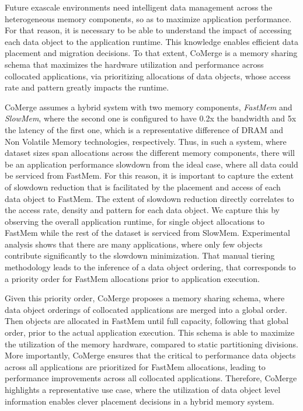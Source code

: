 Future exascale environments need intelligent data management across the heterogeneous memory components, so as to maximize application performance. For that reason, it is necessary to be able to understand the impact of accessing each data object to the application runtime. This knowledge enables efficient data placement and migration decisions. To that extent, CoMerge \cite{Doudali:2017:CTE:3132402.3132418} is a memory sharing schema that maximizes the hardware utilization and performance across collocated applications, via prioritizing allocations of data objects, whose access rate and pattern greatly impacts the runtime.
 
CoMerge assumes a hybrid system with two memory components, \textit{FastMem} and \textit{SlowMem}, where the second one is configured to have 0.2x the bandwidth and 5x the latency of the first one, which is a representative difference of DRAM and Non Volatile Memory technologies, respectively. Thus, in such a system, where dataset sizes span allocations across the different memory  components, there will be an application performance slowdown from the ideal case, where all data could be serviced from FastMem. For this reason, it is important to capture the extent of slowdown reduction that is facilitated by the placement and access of each data object to FastMem. The extent of slowdown reduction directly correlates to the access rate, density and pattern for each data object. We capture this  by observing the overall application runtime, for single object allocations to FastMem while the rest of the dataset is serviced from SlowMem. Experimental analysis shows that there are many applications, where only few objects contribute significantly to the slowdown minimization. That manual tiering methodology leads to the inference of a data object ordering, that corresponds to a priority order for FastMem allocations prior to application execution.

Given this priority order, CoMerge proposes a memory sharing schema, where data object orderings of collocated applications are merged into a global order. Then objects are allocated in FastMem until full capacity, following that global order, prior to the actual application execution. This schema is able to maximize the utilization of the memory hardware, compared to static partitioning divisions. More importantly, CoMerge ensures that  the critical to performance data objects across all applications are prioritized for FastMem allocations, leading to performance improvements across all collocated applications. Therefore, CoMerge highlights a representative use case, where the utilization of data object level information enables clever placement decisions in a hybrid memory system.

